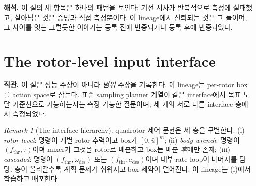 \documentclass[11pt]{article}
\theoremstyle{plain}
\theoremstyle{definition}
\theoremstyle{remark}
\newtheorem{remark}[theorem]{Remark}
\begin{document}
\textbf{해석.} 이 절의 세 항목은 하나의 패턴을 보인다: 기전 서사가 반복적으로 측정에 실패했고,
살아남은 것은 증명과 직접 측정뿐이다. 이 lineage에서 신뢰되는 것은 그 둘이며, 그 사이를 잇는
그럴듯한 이야기는 등록 전에 반증되거나 등록 후에 반증되었다.

\clearpage
\section{The rotor-level input interface}\label{sec:inputspace}

\textbf{직관.} 이 절은 성능 주장이 아니라 \emph{범위} 주장을 기록한다. 이 lineage는 per-rotor
box를 action space로 삼는다. 표준 sampling planner 계열이 같은 interface에서 목표 도달 기준선으로
기능하는지는 측정 가능한 질문이며, 세 개의 서로 다른 interface 층에서 측정되었다.

\begin{remark}[The interface hierarchy]\label{rem:iface-hier}
quadrotor 제어 문헌은 세 층을 구별한다. (i) \emph{rotor-level}: 명령이 개별 rotor 추력이고
box가 $[0,\bar u]^m$; (ii) \emph{body-wrench}: 명령이 $(f_{\mathrm{thr}},\tau)$이며 mixer가 그것을
rotor로 배분하고 box는 배분 \emph{후}에만 존재; (iii) \emph{cascaded}: 명령이
$(f_{\mathrm{thr}},\omega_{\mathrm{des}})$ 또는 $(f_{\mathrm{thr}},a_{\mathrm{des}})$이며 내부
rate loop이 나머지를 담당. 층이 올라갈수록 계획 문제가 쉬워지고 box 제약이 멀어진다. 이
lineage는 (i)에서 학습하고 배포한다.
\end{remark}
\end{document}
